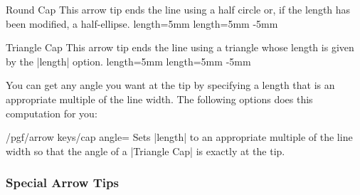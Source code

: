 \begin{arrowcap}{Round Cap}{
    This arrow tip ends the line using a half circle or, if the length has been
    modified, a half-ellipse.
  }%
{length=5mm}%
{length=5mm}%
{-5mm}

    \begin{arrowcapexamples}
        \arrowcapexample[]
        \arrowcapexample[reversed]
        \arrowcapexample[length=.5ex]
        \arrowcapexample[slant=.3]
    \end{arrowcapexamples}
\end{arrowcap}

\begin{arrowcap}{Triangle Cap}{
    This arrow tip ends the line using a triangle whose length is given by the
    |length| option.
}%
{length=5mm}%
{length=5mm}%
{-5mm}

    You can get any angle you want at the tip by specifying a length that is an
    appropriate multiple of the line width. The following options does this
    computation for you:
    \begin{key}{/pgf/arrow keys/cap angle=}
        Sets |length| to an appropriate multiple of the line width so that the
        angle of a |Triangle Cap| is exactly  at the tip.
    \end{key}

    \begin{arrowcapexamples}
        \arrowcapexample[]
        \arrowcapexample[reversed]
        \arrowcapexample[cap angle=60]
        \arrowcapexample[cap angle=60,reversed]
        \arrowcapexample[length=.5ex]
        \arrowcapexample[slant=.3]
    \end{arrowcapexamples}
\end{arrowcap}


\subsubsection{Special Arrow Tips}


